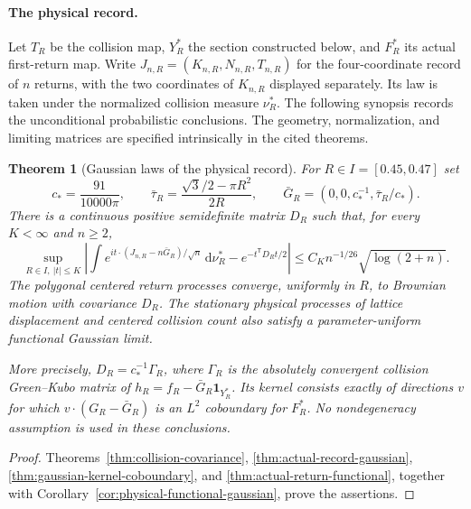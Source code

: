 \documentclass[11pt,reqno]{amsart}
\numberwithin{equation}{section}
\newtheorem{maintheorem}{Theorem}
\theoremstyle{definition}\newtheorem{definition}[theorem]{Definition}
\theoremstyle{remark}\newtheorem{remark}[theorem]{Remark}
\newcommand{\dd}{\,\mathrm d}\newcommand{\one}{\mathbf1}
\begin{document}
\maketitle

\paragraph{The physical record.}
Let $T_R$ be the collision map, $Y_R^*$ the section constructed below,
and $F_R^*$ its actual first-return map. Write
$J_{n,R}=(K_{n,R},N_{n,R},T_{n,R})$ for the four-coordinate record of
$n$ returns, with the two coordinates of $K_{n,R}$ displayed separately.
Its law is taken under the normalized collision measure $\nu_R^*$.
The following synopsis records the unconditional probabilistic
conclusions. The geometry, normalization, and limiting matrices are
specified intrinsically in the cited theorems.

\begin{maintheorem}[Gaussian laws of the physical record]
\label{thm:intro-gaussian}
For $R\in I=[0.45,0.47]$ set
\[
 c_* = \frac{91}{10000\pi},\qquad
 \bar\tau_R=\frac{\sqrt3/2-\pi R^2}{2R},\qquad
 \bar G_R=(0,0,c_*^{-1},\bar\tau_R/c_*).
\]
There is a continuous positive semidefinite matrix $D_R$ such that,
for every $K<\infty$ and $n\ge2$,
\[
 \sup_{R\in I,\ |t|\le K}
 \left|\int e^{it\cdot(J_{n,R}-n\bar G_R)/\sqrt n}\dd\nu_R^*
              -e^{-t^{\mathsf T}D_Rt/2}\right|
 \le C_Kn^{-1/26}\sqrt{\log(2+n)}.
\]
The polygonal centered return processes converge, uniformly in $R$,
to Brownian motion with covariance $D_R$. The stationary physical
processes of lattice displacement and centered collision count also
satisfy a parameter-uniform functional Gaussian limit.

More precisely, $D_R=c_*^{-1}\Gamma_R$, where $\Gamma_R$ is the
absolutely convergent collision Green--Kubo matrix of
$h_R=f_R-\bar G_R\one_{Y_R^*}$. Its kernel consists exactly of directions
$v$ for which $v\cdot(G_R-\bar G_R)$ is an $L^2$ coboundary for
$F_R^*$. No nondegeneracy assumption is used in these conclusions.
\end{maintheorem}
\begin{proof}
Theorems~\ref{thm:collision-covariance},
\ref{thm:actual-record-gaussian}, \ref{thm:gaussian-kernel-coboundary},
and \ref{thm:actual-return-functional}, together with
Corollary~\ref{cor:physical-functional-gaussian}, prove the assertions.
\end{proof}
\end{document}
